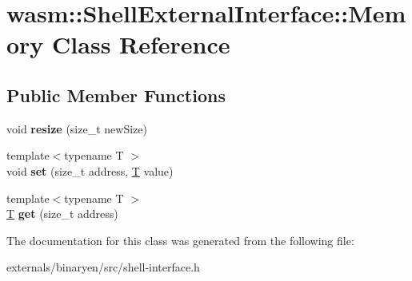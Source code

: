 \hypertarget{classwasm_1_1_shell_external_interface_1_1_memory}{}\section{wasm\+:\+:Shell\+External\+Interface\+:\+:Memory Class Reference}
\label{classwasm_1_1_shell_external_interface_1_1_memory}
\subsection*{Public Member Functions}
\begin{DoxyCompactItemize}
\item 
\mbox{\label{classwasm_1_1_shell_external_interface_1_1_memory_ae11a24c6f6f80476e159ff3f6609cc05}} 
void {\bfseries resize} (size\+\_\+t new\+Size)
\item 
\mbox{\label{classwasm_1_1_shell_external_interface_1_1_memory_af07faf46b5b57370e331518cdd22b069}} 
{\footnotesize template$<$typename T $>$ }\\void {\bfseries set} (size\+\_\+t address, \mbox{\hyperlink{struct_t}{T}} value)
\item 
\mbox{\label{classwasm_1_1_shell_external_interface_1_1_memory_a1b797779896d57ced517f6c2cf56a8ab}} 
{\footnotesize template$<$typename T $>$ }\\\mbox{\hyperlink{struct_t}{T}} {\bfseries get} (size\+\_\+t address)
\end{DoxyCompactItemize}


The documentation for this class was generated from the following file\+:\begin{DoxyCompactItemize}
\item 
externals/binaryen/src/shell-\/interface.\+h\end{DoxyCompactItemize}
